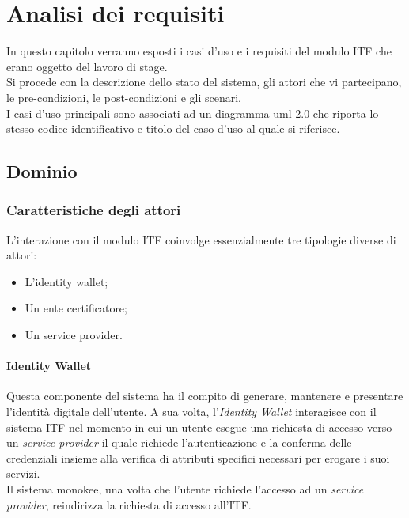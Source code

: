 
\chapter{Analisi dei requisiti}
\label{cap:analisi_dei_requisiti}
In questo capitolo verranno esposti i casi d'uso e i requisiti del modulo \gls{ITF} che erano oggetto del lavoro di stage.\\
Si procede con la descrizione dello stato del sistema, gli attori che vi partecipano, le pre-condizioni, le post-condizioni e gli scenari.\\
I casi d'uso principali sono associati ad un diagramma \gls{uml} 2.0 che riporta lo stesso codice identificativo e titolo del caso d'uso al quale si riferisce.

\section{Dominio}
\subsection{Caratteristiche degli attori}
L'interazione con il modulo \gls{ITF} coinvolge essenzialmente tre tipologie diverse di attori:
\begin{itemize}
	\item L'identity wallet;
	\item Un ente certificatore;
	\item Un service provider.
\end{itemize}

\subsubsection{Identity Wallet}
Questa componente del sistema ha il compito di generare, mantenere e presentare l'identità digitale dell'utente. A sua volta, l'\textit{Identity Wallet} interagisce con il sistema \gls{ITF} nel momento in cui un utente esegue una richiesta di accesso verso un \textit{service provider} il quale richiede l'autenticazione e la conferma delle credenziali insieme alla verifica di attributi specifici necessari per erogare i suoi servizi.\\
Il sistema \gls{monokee}, una volta che l'utente richiede l'accesso ad un \textit{service provider}, reindirizza la richiesta di accesso all'\gls{ITF}.
